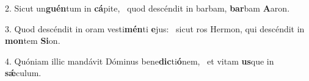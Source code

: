 2. Sicut un\textbf{guén}tum in \textbf{cá}pite, \ast\  quod descéndit in barbam, \textbf{bar}bam \textbf{A}aron.\

3. Quod descéndit in oram vesti\textbf{mén}ti \textbf{e}jus: \ast\  sicut ros Hermon, qui descéndit in \textbf{mon}tem \textbf{Si}on.\

4. Quóniam illic mandávit Dóminus bene\textbf{dic}ti\textbf{ó}nem, \ast\  et vitam \textbf{us}que in \textbf{sǽ}culum.\

